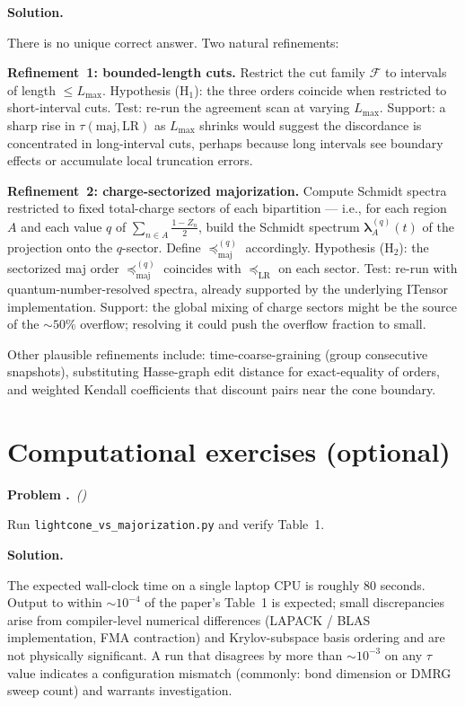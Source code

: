 \documentclass[11pt,a4paper]{article}
\newcounter{problem}
\newenvironment{problem}[1][]{%
  \refstepcounter{problem}%
  \par\medskip\noindent
  \textbf{Problem \theproblem.}\if\relax\detokenize{#1}\relax\else\ \textit{(#1)}\fi\quad\ignorespaces
}{\par\smallskip}
\newenvironment{solution}{%
  \par\noindent\textbf{Solution.}\quad\ignorespaces
}{\par\medskip}
\newcommand{\maj}{\mathrm{maj}}
\newcommand{\LR}{\mathrm{LR}}
\newcommand{\preceqmaj}{\preceq_{\maj}}
\newcommand{\preceqLR}{\preceq_{\LR}}
\begin{document}
\begin{solution}
There is no unique correct answer.  Two natural refinements:

\textbf{Refinement~1: bounded-length cuts.}
Restrict the cut family $\mathcal{F}$ to intervals of length
$\le L_{\max}$.  Hypothesis (H${}_1$): the three orders coincide
when restricted to short-interval cuts.  Test: re-run the agreement
scan at varying $L_{\max}$.  Support: a sharp rise in
$\tau(\maj, \LR)$ as $L_{\max}$ shrinks would suggest the
discordance is concentrated in long-interval cuts, perhaps because
long intervals see boundary effects or accumulate local truncation
errors.

\textbf{Refinement~2: charge-sectorized majorization.}
Compute Schmidt spectra restricted to fixed total-charge sectors of
each bipartition --- i.e., for each region $A$ and each value $q$
of $\sum_{n \in A} \tfrac{1 - Z_n}{2}$, build the Schmidt spectrum
$\bm\lambda_A^{(q)}(t)$ of the projection onto the $q$-sector.
Define $\preceqmaj^{(q)}$ accordingly.  Hypothesis (H${}_2$): the
sectorized maj order $\preceqmaj^{(q)}$ coincides with $\preceqLR$
on each sector.  Test: re-run with quantum-number-resolved spectra,
already supported by the underlying ITensor implementation.
Support: the global mixing of charge sectors might be the source of
the $\sim 50\%$ overflow; resolving it could push the overflow
fraction to small.

Other plausible refinements include: time-coarse-graining (group
consecutive snapshots), substituting Hasse-graph edit distance for
exact-equality of orders, and weighted Kendall coefficients that
discount pairs near the cone boundary.
\end{solution}

\section{Computational exercises (optional)}

\begin{problem}
Run \texttt{lightcone\_vs\_majorization.py} and verify Table~1.
\end{problem}

\begin{solution}
The expected wall-clock time on a single laptop CPU is roughly $80$
seconds.  Output to within $\sim 10^{-4}$ of the paper's Table~1 is
expected; small discrepancies arise from compiler-level
numerical differences (LAPACK / BLAS implementation, FMA contraction)
and Krylov-subspace basis ordering and are not physically
significant.  A run that disagrees by more than $\sim 10^{-3}$ on any
$\tau$ value indicates a configuration mismatch (commonly: bond
dimension or DMRG sweep count) and warrants investigation.
\end{solution}
\end{document}
